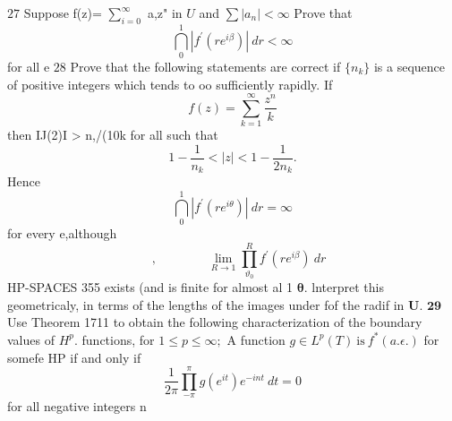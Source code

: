 $27$ Suppose f(z)= $\textstyle\sum_{i=0}^{\infty}$ a,z" in $\boldsymbol{\mathit{U}}$ and $\scriptstyle\sum|a_{n}|<\infty$ Prove that $$ \bigcap_{0}^{1}|f^{\prime}(r e^{i\beta})|\ d r<\infty $$ for all e $\mathrm{28}$ Prove that the following statements are correct if $\{n_{k}\}$ is a sequence of positive integers which tends to oo sufficiently rapidly. If $$ f(z)=\sum_{k=1}^{\infty}{\frac{z^{n}}{k}} $$ then IJ(2)I > n,/(10k for all such that $$ 1-{\frac{1}{n_{k}}}<|z|<1-{\frac{1}{2n_{k}}}. $$ Hence $$ \bigcap_{0}^{1}|f^{\prime}(r e^{i\theta})|\ d r=\infty $$ for every e,although $$ \quad,\qquad\qquad\operatorname*{lim}_{R\to1}\prod_{\vartheta_{0}}^{R}f^{\prime}(r e^{i\beta})\ d r $$HP-SPACES 355 exists (and is finite for almost al 1 ${\boldsymbol{\theta}}.$ lnterpret this geometricaly, in terms of the lengths of the images under fof the radif in ${\boldsymbol{U}}.$ $\mathbf{29}$ Use Theorem 1711 to obtain the following characterization of the boundary values of $H^{p}.$ functions, for $1\leq p\leq\infty;$ A function $g\in L^{p}(T){\mathrm{~is~}}f^{*}\left(a.\epsilon.\right)$ for somefe HP if and only if $$ \frac{1}{2\pi}\prod_{-\pi}^{\pi}g(e^{i t})e^{-i n t}~d t=0 $$ for all negative integers n